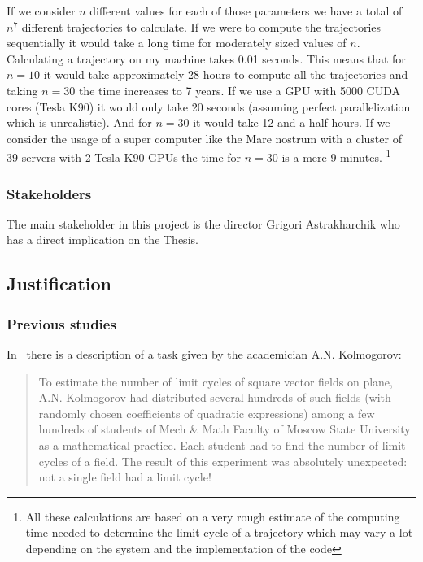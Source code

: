If we consider $n$ different values for each of those parameters we have a total
of $n^7$ different trajectories to calculate. If we were to compute the
trajectories sequentially it would take a long time for moderately sized values
of $n$. Calculating a trajectory on my machine takes 0.01 seconds. This means
that for $n=10$ it would take approximately 28 hours to compute all the
trajectories and taking $n=30$ the time increases to 7 years. If we use a GPU
with 5000 CUDA cores (Tesla K90) it would only take 20 seconds (assuming perfect
parallelization which is unrealistic). And for $n=30$ it would take 12 and a
half hours. If we consider the usage of a super computer like the Mare nostrum
with a cluster of 39 servers with 2 Tesla K90 GPUs the time for $n=30$ is a mere
9 minutes. \footnote{All these calculations are based on a very rough estimate
of the computing time needed to determine the limit cycle of a trajectory which
may vary a lot depending on the system and the implementation of the code}

\subsubsection{Stakeholders}

The main stakeholder in this project is the director Grigori Astrakharchik who
has a direct implication on the Thesis.



\pagebreak
\subsection{Justification}
\subsubsection{Previous studies}


In~\cite{kuznetsov_visualization_2013} there is a description of a task given by
the academician A.N. Kolmogorov:

\begin{quote}
To estimate the number of limit cycles of square vector fields on plane, A.N. Kolmogorov had
distributed several hundreds of such fields (with randomly chosen coefficients
of quadratic expressions) among a few hundreds of students of Mech \& Math
Faculty of Moscow State University as a mathematical practice. Each student had
to find the number of limit cycles of a field. The result of this experiment was
absolutely unexpected: not a single field had a limit cycle!
\end{quote}

